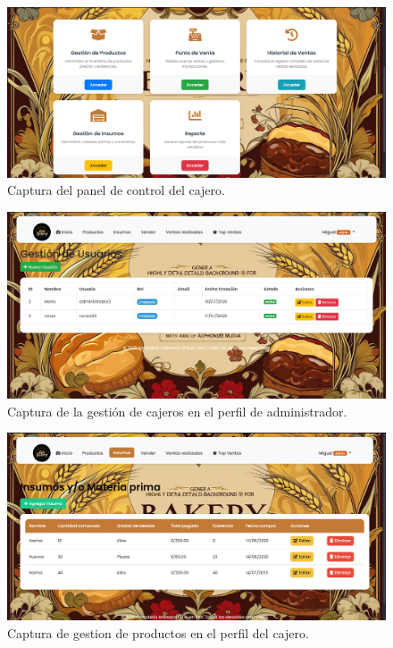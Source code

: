 \documentclass[conference]{IEEEtran}
\begin{document}
\begin{figure}[htbp]
\centerline{\includegraphics[width=\columnwidth]{images/control_cajero.png}}
\caption{Captura del panel de control del cajero.}
\label{fig:clases}
\end{figure}

\begin{figure}[htbp]
\centerline{\includegraphics[width=\columnwidth]{images/gestor_cajeros.png}}
\caption{Captura de la gestión de cajeros en el perfil de administrador.}
\label{fig:clases}
\end{figure}

\begin{figure}[htbp]
\centerline{\includegraphics[width=\columnwidth]{images/gestor_insumos.png}}
\caption{Captura de gestion de productos en el perfil del cajero.}
\label{fig:clases}
\end{figure}
\end{document}
